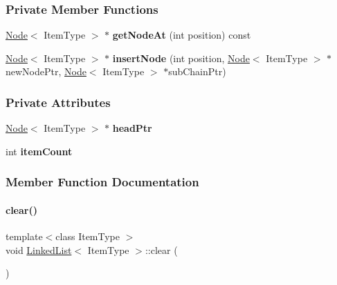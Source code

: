 \subsubsection*{Private Member Functions}
\begin{DoxyCompactItemize}
\item 
\hypertarget{class_linked_list_ac707777d9e457c986eb18c1366efafd2}{}\label{class_linked_list_ac707777d9e457c986eb18c1366efafd2} 
\hyperlink{class_node}{Node}$<$ Item\+Type $>$ $\ast$ {\bfseries get\+Node\+At} (int position) const
\item 
\hypertarget{class_linked_list_ab09a3ae73c7fa669e0116bd510d55a9d}{}\label{class_linked_list_ab09a3ae73c7fa669e0116bd510d55a9d} 
\hyperlink{class_node}{Node}$<$ Item\+Type $>$ $\ast$ {\bfseries insert\+Node} (int position, \hyperlink{class_node}{Node}$<$ Item\+Type $>$ $\ast$new\+Node\+Ptr, \hyperlink{class_node}{Node}$<$ Item\+Type $>$ $\ast$sub\+Chain\+Ptr)
\end{DoxyCompactItemize}
\subsubsection*{Private Attributes}
\begin{DoxyCompactItemize}
\item 
\hypertarget{class_linked_list_ae59caadbc6814867c20aa78f1bc9a566}{}\label{class_linked_list_ae59caadbc6814867c20aa78f1bc9a566} 
\hyperlink{class_node}{Node}$<$ Item\+Type $>$ $\ast$ {\bfseries head\+Ptr}
\item 
\hypertarget{class_linked_list_a964b92cf1253774e9e35f331d5fb3490}{}\label{class_linked_list_a964b92cf1253774e9e35f331d5fb3490} 
int {\bfseries item\+Count}
\end{DoxyCompactItemize}


\subsubsection{Member Function Documentation}
\hypertarget{class_linked_list_a7d1d9cf83eef67b6c4d700a3cc5970e1}{}\label{class_linked_list_a7d1d9cf83eef67b6c4d700a3cc5970e1} 
\paragraph{\texorpdfstring{clear()}{clear()}}
{\footnotesize\ttfamily template$<$class Item\+Type $>$ \\
void \hyperlink{class_linked_list}{Linked\+List}$<$ Item\+Type $>$\+::clear (\begin{DoxyParamCaption}{ }\end{DoxyParamCaption})\hspace{0.3cm}{\ttfamily [virtual]}}

